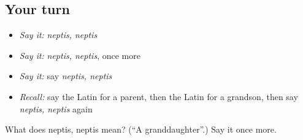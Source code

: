 \subsection*{Your turn}
\begin{itemize}
\raggedright
  \item \emph{Say it:} \emph{neptis, neptis}
  \item \emph{Say it:} \emph{neptis, neptis}, once more
  \item \emph{Say it:} say \emph{neptis, neptis}
  \item \emph{Recall:} say the Latin for a parent, then the Latin for a grandson, then say \emph{neptis, neptis} again
\end{itemize}

\begin{tcolorbox}[breakable,colback=teal!4,colframe=teal!35!black,title={Before you move on}]
What does neptis, neptis mean? (\textquotedblleft{}A granddaughter\textquotedblright{}.) Say it once more.
\end{tcolorbox}
